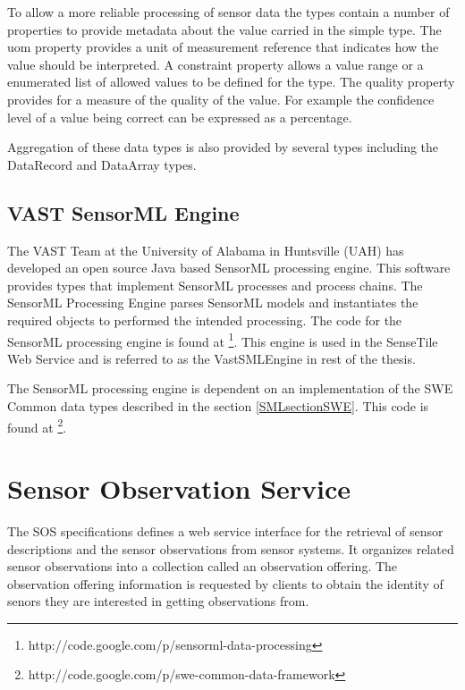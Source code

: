 \documentclass[]{final_report}
\begin{document}
To allow a more reliable processing of sensor data the types contain a number of properties to provide metadata about the value carried in the simple type. The uom property provides a unit of measurement reference that indicates how the value should be interpreted.  A constraint property allows a value range or a enumerated list of allowed values to be defined for the type. The quality property provides for a measure of the quality of the value.  For example the confidence level of a value being correct can be expressed as a percentage.

Aggregation of these data types is also provided by several types including the DataRecord and DataArray types.



\subsection{VAST SensorML Engine}\label{VastSensorMLEngineSec}
The VAST Team at the University of Alabama in Huntsville (UAH) has developed an open source Java based SensorML processing engine. This software provides types that implement SensorML processes and process chains. The SensorML Processing Engine parses SensorML models and instantiates the required objects to performed the intended processing. The code for the SensorML processing engine is found at \footnote{http://code.google.com/p/sensorml-data-processing}. This engine is used in the SenseTile Web Service and is referred to as the VastSMLEngine in rest of the thesis. 

The SensorML processing engine is dependent on an implementation of the SWE Common data types described in the section \ref{SMLsectionSWE}. This code is found at \footnote{http://code.google.com/p/swe-common-data-framework}.

\section{Sensor Observation Service}\label{SOSSec}
The SOS specifications defines a web service interface for the retrieval of sensor descriptions and the sensor observations from sensor systems. It organizes related sensor observations into a collection called an observation offering. The observation offering information is requested by clients to obtain the identity of senors they are interested in getting observations from.
\end{document}
